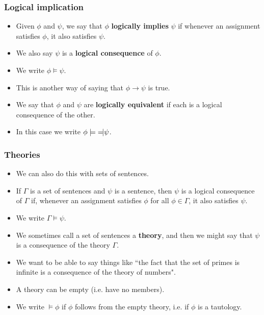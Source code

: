 \documentclass[handout]{beamer}
\newcommand{\lequiv}{\models\text{\reflectbox{$\models$}}}
\newcommand{\ra}{\rightarrow}
\begin{document}
\begin{frame}
\frametitle{Logical implication}
\begin{itemize}
\item Given $\phi$ and $\psi$, we say that $\phi$ \textbf{logically implies} $\psi$ if whenever an assignment satisfies $\phi$, it also satisfies $\psi$. 
\vspace{0.3cm}
\item We also say $\psi$ is a \textbf{logical consequence} of $\phi$.
\vspace{0.3cm}
\item We write $\phi\models \psi$.
\vspace{0.3cm}
\item This is another way of saying that $\phi\ra\psi$ is true. 
\vspace{0.3cm}
\item We say that $\phi$ and $\psi$ are \textbf{logically equivalent} if each is a logical consequence of the other. 
\vspace{0.3cm}
\item In this case we write $\phi \lequiv \psi$. 
\end{itemize}
\end{frame}

\begin{frame}
\frametitle{Theories}
\begin{itemize}
\item We can also do this with sets of sentences. 
\vspace{0.3cm}
\item If $\Gamma$ is a set of sentences and $\psi$ is a sentence, then $\psi$ is a logical consequence of $\Gamma$ if, whenever an assignment satisfies $\phi$ for all $\phi\in\Gamma$, it also satisfies $\psi$. 
\vspace{0.3cm}
\item We write $\Gamma\models \psi$. 
\vspace{0.3cm}
\item We sometimes call a set of sentences a \textbf{theory}, and then we might say that $\psi$ is a consequence of the theory $\Gamma$. 
\vspace{0.3cm}
\item We want to be able to say things like ``the fact that the set of primes is infinite is a consequence of the theory of numbers". 
\vspace{0.3cm}
\item A theory can be empty (i.e. have no members). 
\vspace{0.3cm}
\item We write $\models \phi$ if $\phi$ follows from the empty theory, i.e. if $\phi$ is a tautology. 
\end{itemize}
\end{frame}
\end{document}
